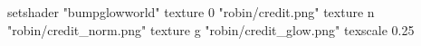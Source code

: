 setshader "bumpglowworld"
   texture 0 "robin/credit.png"
   texture n "robin/credit_norm.png"
   texture g "robin/credit_glow.png"
texscale 0.25